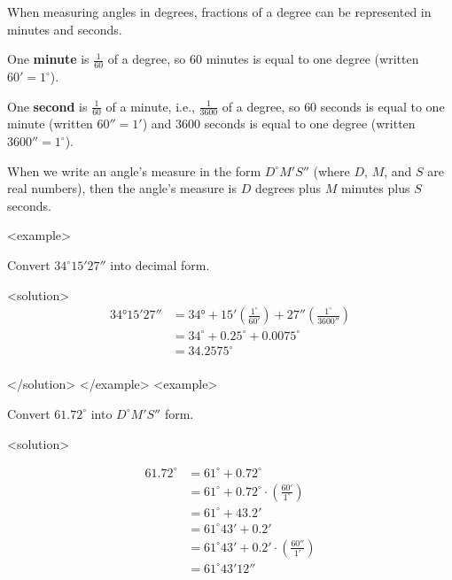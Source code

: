       When measuring angles in degrees, fractions of a degree can be represented in minutes and seconds.
    
    \begin{myDefinition}
        
          One \textbf{minute} is $\frac{1}{60}$ of a degree, so $60$ minutes is equal to one degree (written $
          60'=1^{\circ}$).
        
        
          One \textbf{second} is $\frac{1}{60}$ of a minute, i.e., $\frac{1}{3600}$ of a degree, so $60$ seconds is equal to one minute (written $60''=1'$) and $3600$ seconds is equal to one degree (written $3600''=1^{\circ}$).
        
    \end{myDefinition}
    
      When we write an angle's measure in the form $D^{\circ}M'S''$ (where $D$, $M$, and $S$ are real numbers), then the angle's measure is $D$ degrees plus $M$ minutes plus $S$ seconds.
    
    <example>
        
          Convert $34^{\circ}15'27''$ into decimal form.
        
      <solution>
          \begin{align*}
            \ang{34;15;27} &= \ang{34}+15'\left( \frac{1^{\circ}}{60'} \right)+27'' \left(\frac{1^{\circ}}{3600''}\right) \\
             &= 34^{\circ}+0.25^{\circ}+0.0075^{\circ} \\
             &= 34.2575^{\circ} \\
          \end{align*}
        
      </solution>
    </example>
    <example>
        
          Convert $61.72^{\circ}$ into $D^{\circ}M'S''$ form.
        
      <solution>
        
          \begin{align*}
             61.72^{\circ} &= 61^{\circ}+0.72^{\circ} \\
             &= 61^{\circ}+0.72^{\circ} \cdot \left( \frac{60'}{1^{\circ}} \right) \\
             &= 61^{\circ}+43.2' \\
             &= 61^{\circ}43'+0.2' \\
             &= 61^{\circ}43'+0.2' \cdot \left( \frac{60''}{1'} \right) \\
             &= 61^{\circ}43'12''\\
          \end{align*}
        
